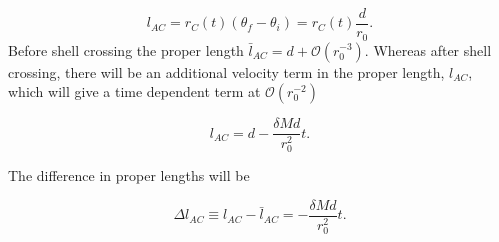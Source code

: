 \documentclass[aps,showpacs,onecolumn,floats,prd,superscriptaddress,nofootinbib]{revtex4-1}
\begin{document}
\begin{equation}
	l_{AC} = r_C(t) (\theta_f - \theta_i) = r_C(t) \frac{d}{r_0}.
\end{equation}
Before shell crossing the proper length $\bar{l}_{AC} = d + \mathcal{O}(r_0^{-3})$. Whereas after shell crossing, there will be an additional velocity term in the proper length, $l_{AC}$, which will give a time dependent term at $\mathcal{O}(r_0^{-2})$

\begin{equation}
	l_{AC} = d - \frac{\delta M d}{r_0^2} t.
\end{equation}

The difference in proper lengths will be 

\begin{equation}
	\Delta l_{AC} \equiv l_{AC} - \bar{l}_{AC} = - \frac{\delta M d}{r_0^2} t.
\end{equation}
\end{document}
